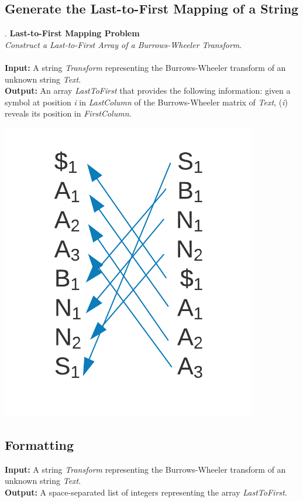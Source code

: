 \documentclass{article}
\renewcommand{\sc}[1]{\text{\scshape #1}}
\begin{document}
\subsection{Generate the Last-to-First Mapping of a String}.
\hline\vspace{5}
\noindent\textbf{Last-to-First Mapping Problem}\\
\emph{Construct a Last-to-First Array of a Burrows-Wheeler Transform}.\\ \\
\textbf{Input:} A string \emph{Transform} representing the Burrows-Wheeler transform of an unknown string \emph{Text}. \\
\textbf{Output:} An array \emph{LastToFirst} that provides the following information: given a symbol at position \emph{i} in \emph{LastColumn} of the Burrows-Wheeler matrix of \emph{Text}, \sc{LastToFirst}(\emph{i}) reveals its position in \emph{FirstColumn}.
\begin{center}
    \includegraphics[scale=0.2]{c9/logos/9K.png} 
\end{center}
\hline\vspace{5}

\subsection*{Formatting}
\textbf{Input:} A string \emph{Transform} representing the Burrows-Wheeler transform of an unknown string \emph{Text}.\\
\noindent\textbf{Output:} A space-separated list of integers representing the array \emph{LastToFirst}.
\end{document}
